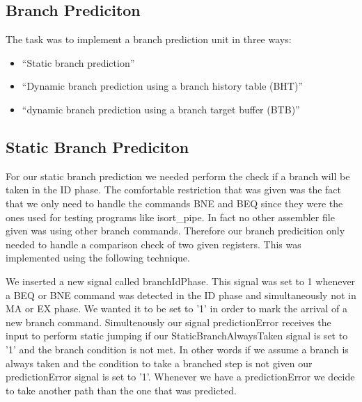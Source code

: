
\subsection{Branch Prediciton}
\label{sec:branchPrediction}

The task was to implement a branch prediction unit in three ways:

\begin{itemize}
\item ``Static branch prediction''
\item ``Dynamic branch prediction using a branch history table (BHT)''
\item ``dynamic branch prediction using a branch target buffer (BTB)''
\end{itemize}

\subsection{Static Branch Prediciton}
\label{sec:staticBranchPrediction}

For our static branch prediction we needed perform the check if a branch will be taken in the ID phase. The comfortable restriction that was given was the fact that we only need to handle the commands BNE and BEQ since they were the ones used for testing programs like isort\_pipe. In fact no other assembler file given was using other branch commands. Therefore our branch predicition only needed to handle a comparison check of two given registers. This was implemented using the following technique. 

We inserted a new signal called branchIdPhase. This signal was set to 1 whenever a BEQ or BNE command was detected in the ID phase and simultaneously not in MA or EX phase. We wanted it to be set to '1' in order to mark the arrival of a new branch command. Simultenously our signal predictionError receives the input to perform static jumping if our StaticBranchAlwaysTaken signal is set to '1' and the branch condition is not met. In other words if we assume a branch is always taken and the condition to take a branched step is not given our predictionError signal is set to '1'. Whenever we have a predictionError we decide to take another path than the one that was predicted.

